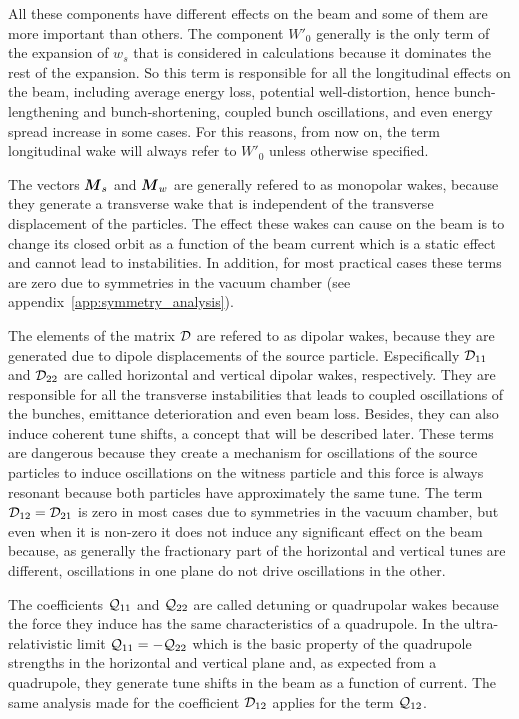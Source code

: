     All these components have different effects on the beam and some of them are more important than others. The component $W'_0$ generally is the only term of the expansion of $w_s$ that is considered in calculations because it dominates the rest of the expansion. So this term is responsible for all the longitudinal effects on the beam, including average energy loss, potential well-distortion, hence bunch-lengthening and bunch-shortening, coupled bunch oscillations, and even energy spread increase in some cases. For this reasons, from now on, the term longitudinal wake will always refer to $W'_0$ unless otherwise specified.

    The vectors $\boldsymbol{M}_s$ and $\boldsymbol{M}_w$ are generally refered to as monopolar wakes, because they generate a transverse wake that is independent of the transverse displacement of the particles. The effect these wakes can cause on the beam is to change its closed orbit as a function of the beam current which is a static effect and cannot lead to instabilities. In addition, for most practical cases these terms are zero due to symmetries in the vacuum chamber (see appendix~\ref{app:symmetry_analysis}).

    The elements of the matrix $\mathcal{D}$ are refered to as dipolar wakes, because they are generated due to dipole displacements of the source particle. Especifically $\mathcal{D}_{11}$ and $\mathcal{D}_{22}$ are called horizontal and vertical dipolar wakes, respectively. They are responsible for all the transverse instabilities that leads to coupled oscillations of the bunches, emittance deterioration and even beam loss. Besides, they can also induce coherent tune shifts, a concept that will be described later. These terms are dangerous because they create a mechanism for oscillations of the source particles to induce oscillations on the witness particle and this force is always resonant because both particles have approximately the same tune. The term $\mathcal{D}_{12}=\mathcal{D}_{21}$ is zero in most cases due to symmetries in the vacuum chamber, but even when it is non-zero it does not induce any significant effect on the beam because, as generally the fractionary part of the horizontal and vertical tunes are different, oscillations in one plane do not drive oscillations in the other.

    The coefficients $\mathcal{Q}_{11}$ and $\mathcal{Q}_{22}$ are called detuning or quadrupolar wakes because the force they induce has the same characteristics of a quadrupole. In the ultra-relativistic limit $\mathcal{Q}_{11}=-\mathcal{Q}_{22}$ which is the basic property of the quadrupole strengths in the horizontal and vertical plane and, as expected from a quadrupole, they generate tune shifts in the beam as a function of current. The same analysis made for the coefficient $\mathcal{D}_{12}$ applies for the term $\mathcal{Q}_{12}$.

